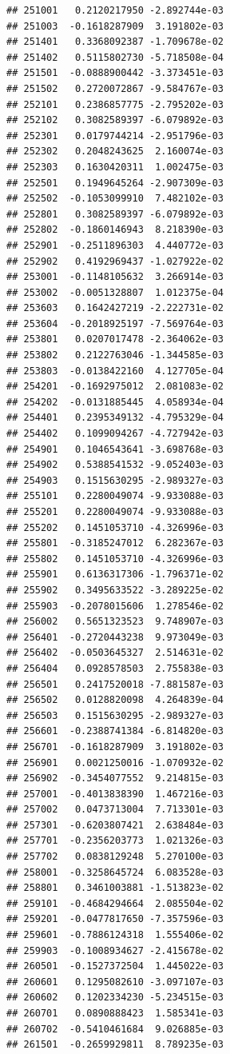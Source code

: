 \documentclass[ignorenonframetext,]{beamer}
\begin{document}
\begin{frame}[fragile]
\begin{verbatim}
## 251001   0.2120217950 -2.892744e-03
## 251003  -0.1618287909  3.191802e-03
## 251401   0.3368092387 -1.709678e-02
## 251402   0.5115802730 -5.718508e-04
## 251501  -0.0888900442 -3.373451e-03
## 251502   0.2720072867 -9.584767e-03
## 252101   0.2386857775 -2.795202e-03
## 252102   0.3082589397 -6.079892e-03
## 252301   0.0179744214 -2.951796e-03
## 252302   0.2048243625  2.160074e-03
## 252303   0.1630420311  1.002475e-03
## 252501   0.1949645264 -2.907309e-03
## 252502  -0.1053099910  7.482102e-03
## 252801   0.3082589397 -6.079892e-03
## 252802  -0.1860146943  8.218390e-03
## 252901  -0.2511896303  4.440772e-03
## 252902   0.4192969437 -1.027922e-02
## 253001  -0.1148105632  3.266914e-03
## 253002  -0.0051328807  1.012375e-04
## 253603   0.1642427219 -2.222731e-02
## 253604  -0.2018925197 -7.569764e-03
## 253801   0.0207017478 -2.364062e-03
## 253802   0.2122763046 -1.344585e-03
## 253803  -0.0138422160  4.127705e-04
## 254201  -0.1692975012  2.081083e-02
## 254202  -0.0131885445  4.058934e-04
## 254401   0.2395349132 -4.795329e-04
## 254402   0.1099094267 -4.727942e-03
## 254901   0.1046543641 -3.698768e-03
## 254902   0.5388541532 -9.052403e-03
## 254903   0.1515630295 -2.989327e-03
## 255101   0.2280049074 -9.933088e-03
## 255201   0.2280049074 -9.933088e-03
## 255202   0.1451053710 -4.326996e-03
## 255801  -0.3185247012  6.282367e-03
## 255802   0.1451053710 -4.326996e-03
## 255901   0.6136317306 -1.796371e-02
## 255902   0.3495633522 -3.289225e-02
## 255903  -0.2078015606  1.278546e-02
## 256002   0.5651323523  9.748907e-03
## 256401  -0.2720443238  9.973049e-03
## 256402  -0.0503645327  2.514631e-02
## 256404   0.0928578503  2.755838e-03
## 256501   0.2417520018 -7.881587e-03
## 256502   0.0128820098  4.264839e-04
## 256503   0.1515630295 -2.989327e-03
## 256601  -0.2388741384 -6.814820e-03
## 256701  -0.1618287909  3.191802e-03
## 256901   0.0021250016 -1.070932e-02
## 256902  -0.3454077552  9.214815e-03
## 257001  -0.4013838390  1.467216e-03
## 257002   0.0473713004  7.713301e-03
## 257301  -0.6203807421  2.638484e-03
## 257701  -0.2356203773  1.021326e-03
## 257702   0.0838129248  5.270100e-03
## 258001  -0.3258645724  6.083528e-03
## 258801   0.3461003881 -1.513823e-02
## 259101  -0.4684294664  2.085504e-02
## 259201  -0.0477817650 -7.357596e-03
## 259601  -0.7886124318  1.555406e-02
## 259903  -0.1008934627 -2.415678e-02
## 260501  -0.1527372504  1.445022e-03
## 260601   0.1295082610 -3.097107e-03
## 260602   0.1202334230 -5.234515e-03
## 260701   0.0890888423  1.585341e-03
## 260702  -0.5410461684  9.026885e-03
## 261501  -0.2659929811  8.789235e-03

\end{verbatim}
\end{frame}
\end{document}
